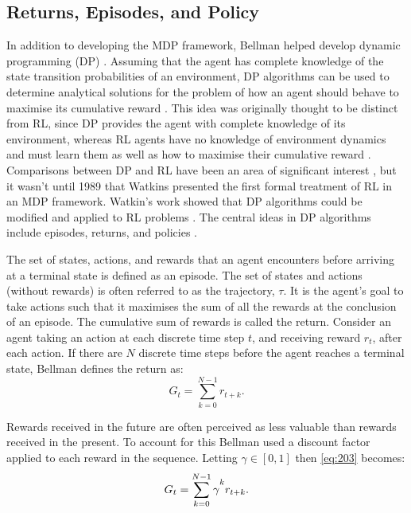 \subsection{Returns, Episodes, and Policy} \label{rep}
In addition to  developing the MDP framework, Bellman helped develop dynamic programming (DP) \cite{Bellm1954}. Assuming that the agent has complete knowledge of the state transition probabilities of an environment, DP algorithms can be used to determine analytical solutions for the problem of how an agent should behave to maximise its cumulative reward \cite{Bellm1954, Howard1960}. This idea was originally thought to be distinct from RL, since DP provides the agent with complete knowledge of its environment, whereas RL agents have no knowledge of environment dynamics and must learn them as well as how to maximise their cumulative reward \cite{Sutton2018}. Comparisons between DP and RL have been an area of significant interest \cite{Bellm1959, Witten1977, Werbos1987}, but it wasn't until 1989 that Watkins presented the first formal treatment of RL in an MDP framework. Watkin's work showed that DP algorithms could be modified and applied to RL problems \cite{Watkins1989}. The central ideas in DP algorithms include episodes, returns, and policies \cite{Sutton2018}.

The set of states, actions, and rewards that an agent encounters before arriving at a terminal state is defined as an episode. The set of states and actions (without rewards) is often referred to as the trajectory, $\tau$. It is the agent's goal to take actions such that it maximises the sum of all the rewards at the conclusion of an episode. The cumulative sum of rewards is called the return. Consider an agent taking an action at each discrete time step $t$, and receiving reward $r_t$, after each action. If there are $N$ discrete time steps before the agent reaches a terminal state, Bellman defines the return as:
\begin{equation}
	G_t = \sum_{k = 0}^{N-1} r_{t + k}. \label{eq:203}
\end{equation}

Rewards received in the future are often perceived as less valuable than rewards received in the present. To account for this Bellman used a discount factor applied to each reward in the sequence. Letting $\gamma \in [0,1]$ then \ref{eq:203} becomes:
\begin{equation}
	G_t = \sum_{k = 0}^{N-1}\gamma\mystrut^k r_{t+k}. \label{eq:204}
\end{equation}

